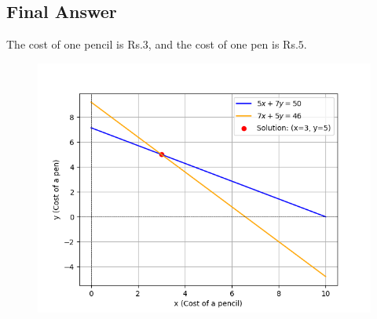 \documentclass[journal]{IEEEtran}
\begin{document}
\subsection{Final Answer}
The cost of one pencil is Rs.\(3\), and the cost of one pen is Rs.\(5\).

\begin{figure}[h!]
   \centering
   \includegraphics[width=0.7\columnwidth]{figs/fig.png}
\end{figure}
\end{document}
